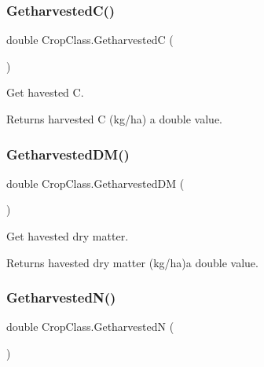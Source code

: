 \subsubsection{\texorpdfstring{GetharvestedC()}{GetharvestedC()}}
{\footnotesize\ttfamily double Crop\+Class.\+GetharvestedC (\begin{DoxyParamCaption}{ }\end{DoxyParamCaption})\hspace{0.3cm}{\ttfamily [inline]}}



Get havested C. 

\begin{DoxyReturn}{Returns}
harvested C (kg/ha) a double value. 
\end{DoxyReturn}
\mbox{\label{class_crop_class_aacb43bdbade9fa2b4bcb29586dfae7f8}} 
\subsubsection{\texorpdfstring{GetharvestedDM()}{GetharvestedDM()}}
{\footnotesize\ttfamily double Crop\+Class.\+Getharvested\+DM (\begin{DoxyParamCaption}{ }\end{DoxyParamCaption})\hspace{0.3cm}{\ttfamily [inline]}}



Get havested dry matter. 

\begin{DoxyReturn}{Returns}
havested dry matter (kg/ha)a double value. 
\end{DoxyReturn}
\mbox{\label{class_crop_class_a646ad4cebd2bb84233e30e10ecdbb5d3}} 
\subsubsection{\texorpdfstring{GetharvestedN()}{GetharvestedN()}}
{\footnotesize\ttfamily double Crop\+Class.\+GetharvestedN (\begin{DoxyParamCaption}{ }\end{DoxyParamCaption})\hspace{0.3cm}{\ttfamily [inline]}}



